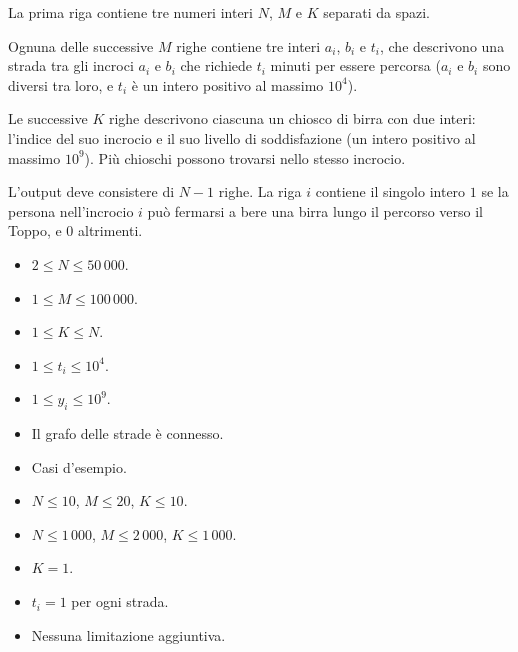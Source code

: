 \InputFile
La prima riga contiene tre numeri interi $N$, $M$ e $K$ separati da spazi.

Ognuna delle successive $M$ righe contiene tre interi $a_i$, $b_i$ e $t_i$, che descrivono una strada tra gli incroci $a_i$ e $b_i$ che richiede $t_i$ minuti per essere percorsa ($a_i$ e $b_i$ sono diversi tra loro, e $t_i$ è un intero positivo al massimo $10^4$).

Le successive $K$ righe descrivono ciascuna un chiosco di birra con due interi: l'indice del suo incrocio e il suo livello di soddisfazione (un intero positivo al massimo $10^9$). Più chioschi possono trovarsi nello stesso incrocio.

\OutputFile
L'output deve consistere di $N-1$ righe. La riga $i$ contiene il singolo intero $1$ se la persona nell'incrocio $i$ può fermarsi a bere una birra lungo il percorso verso il Toppo, e $0$ altrimenti.

\Constraints
\begin{itemize}
    \item $2 \le N \le 50\,000$.
    \item $1 \le M \le 100\,000$.
    \item $1 \le K \le N$.
    \item $1 \le t_i \le 10^4$.
    \item $1 \le y_i \le 10^9$.
    \item Il grafo delle strade è connesso.
\end{itemize}

\Scoring
\begin{itemize}
    \item \subtask Casi d'esempio.
    \item \subtask $N \le 10$, $M \le 20$, $K \le 10$.
    \item \subtask $N \le 1\,000$, $M \le 2\,000$, $K \le 1\,000$.
    \item \subtask $K = 1$.
    \item \subtask $t_i = 1$ per ogni strada.
    \item \subtask Nessuna limitazione aggiuntiva.
\end{itemize}

\Examples
\begin{example}
\end{example}

